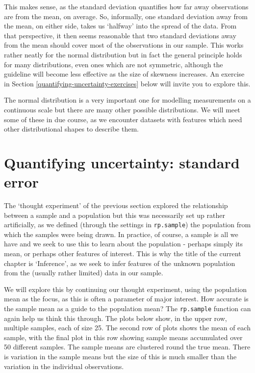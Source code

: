 \documentclass[
]{book}
\begin{document}
This makes sense, as the standard deviation quantifies how far away observations are from the mean, on average. So, informally, one standard deviation away from the mean, on either side, takes us `halfway' into the spread of the data. From that perspective, it then seems reasonable that two standard deviations away from the mean should cover most of the observations in our sample. This works rather neatly for the normal distribution but in fact the general principle holds for many distributions, even ones which are not symmetric, although the guideline will become less effective as the size of skewness increases. An exercise in Section \ref{quantifying-uncertainty-exercises} below will invite you to explore this.

The normal distribution is a very important one for modelling measurements on a continuous scale but there are many other possible distributions. We will meet some of these in due course, as we encounter datasets with features which need other distributional shapes to describe them.

\section{Quantifying uncertainty: standard error}\label{quantifying-uncertainty-standard-error}

The `thought experiment' of the previous section explored the relationship between a sample and a population but this was necessarily set up rather artificially, as we defined (through the settings in \texttt{rp.sample}) the population from which the samples were being drawn. In practice, of course, a sample is all we have and we seek to use this to learn about the population - perhaps simply its mean, or perhaps other features of interest. This is why the title of the current chapter is `Inference', as we seek to infer features of the unknown population from the (usually rather limited) data in our sample.

We will explore this by continuing our thought experiment, using the population mean as the focus, as this is often a parameter of major interest. How accurate is the sample mean as a guide to the population mean? The \texttt{rp.sample} function can again help us think this through. The plots below show, in the upper row, multiple samples, each of size 25. The second row of plots shows the mean of each sample, with the final plot in this row showing sample means accumulated over 50 different samples. The sample means are clustered round the true mean. There is variation in the sample means but the size of this is much smaller than the variation in the individual observations.
\end{document}
